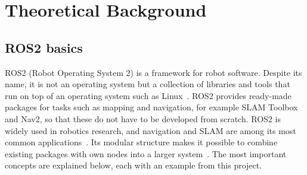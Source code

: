 \chapter{Theoretical Background}
\label{ch:theory}

\section{ROS2 basics}
\label{sec:ros2_basics}

ROS2 (Robot Operating System 2) is a framework for robot software. Despite its name, it is not an operating system but a collection of libraries and tools that run on top of an operating system such as Linux~\citep{ros2_jazzy}. ROS2 provides ready-made packages for tasks such as mapping and navigation, for example SLAM Toolbox and Nav2, so that these do not have to be developed from scratch. ROS2 is widely used in robotics research, and navigation and SLAM are among its most common applications~\citep{albatati2026}. Its modular structure makes it possible to combine existing packages with own nodes into a larger system~\citep{bonci2023}. The most important concepts are explained below, each with an example from this project.

